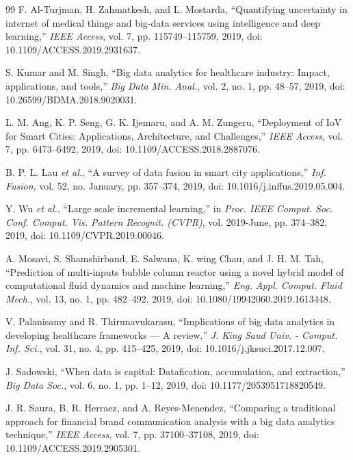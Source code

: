 \documentclass[10pt,a4paper]{article}
\begin{document}
\begin{thebibliography}{99}
F. Al-Turjman, H. Zahmatkesh, and L. Mostarda, ``Quantifying uncertainty in internet of medical things and big-data services using intelligence and deep learning,'' \textit{IEEE Access}, vol. 7, pp. 115749--115759, 2019, doi: 10.1109/ACCESS.2019.2931637.

S. Kumar and M. Singh, ``Big data analytics for healthcare industry: Impact, applications, and tools,'' \textit{Big Data Min. Anal.}, vol. 2, no. 1, pp. 48--57, 2019, doi: 10.26599/BDMA.2018.9020031.

L. M. Ang, K. P. Seng, G. K. Ijemaru, and A. M. Zungeru, ``Deployment of IoV for Smart Cities: Applications, Architecture, and Challenges,'' \textit{IEEE Access}, vol. 7, pp. 6473--6492, 2019, doi: 10.1109/ACCESS.2018.2887076.

B. P. L. Lau \textit{et al.}, ``A survey of data fusion in smart city applications,'' \textit{Inf. Fusion}, vol. 52, no. January, pp. 357--374, 2019, doi: 10.1016/j.inffus.2019.05.004.

Y. Wu \textit{et al.}, ``Large scale incremental learning,'' in \textit{Proc. IEEE Comput. Soc. Conf. Comput. Vis. Pattern Recognit. (CVPR)}, vol. 2019-June, pp. 374--382, 2019, doi: 10.1109/CVPR.2019.00046.

A. Mosavi, S. Shamshirband, E. Salwana, K. wing Chau, and J. H. M. Tah, ``Prediction of multi-inputs bubble column reactor using a novel hybrid model of computational fluid dynamics and machine learning,'' \textit{Eng. Appl. Comput. Fluid Mech.}, vol. 13, no. 1, pp. 482--492, 2019, doi: 10.1080/19942060.2019.1613448.

V. Palanisamy and R. Thirunavukarasu, ``Implications of big data analytics in developing healthcare frameworks --- A review,'' \textit{J. King Saud Univ. - Comput. Inf. Sci.}, vol. 31, no. 4, pp. 415--425, 2019, doi: 10.1016/j.jksuci.2017.12.007.

J. Sadowski, ``When data is capital: Datafication, accumulation, and extraction,'' \textit{Big Data Soc.}, vol. 6, no. 1, pp. 1--12, 2019, doi: 10.1177/2053951718820549.

J. R. Saura, B. R. Herraez, and A. Reyes-Menendez, ``Comparing a traditional approach for financial brand communication analysis with a big data analytics technique,'' \textit{IEEE Access}, vol. 7, pp. 37100--37108, 2019, doi: 10.1109/ACCESS.2019.2905301.


\end{thebibliography}
\end{document}
